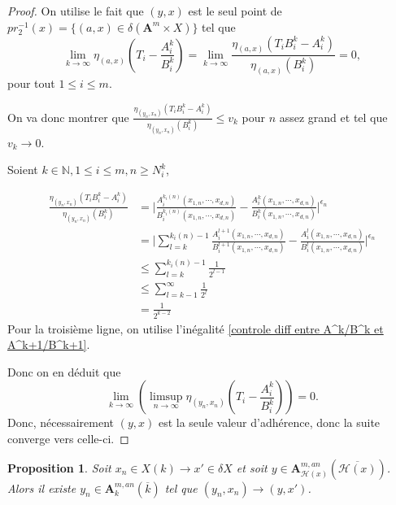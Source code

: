 \documentclass[11pt]{article}
\newcommand{\N}{\mathbb{N}}
\newcommand{\ana}{\mathbf{A}}
\newtheorem{prop}[thm]{Proposition}
\begin{document}
\begin{proof}
On utilise le fait que $(y,x)$ est le seul point de $pr_2^{-1}(x) = \lbrace (a,x) \in \delta (\ana^m \times X)\rbrace$ tel que 
$$\lim\limits_{k \to \infty} \eta_{(a,x)} (T_{i} - \frac{A^k_{i}}{B_{i}^k}) = \lim\limits_{k \to \infty} \frac{\eta_{(a,x)} (T_{i}B_{i}^k - A^k_{i})}{\eta_{(a,x)}(B_{i}^k)} = 0,$$
pour tout $1 \leq i \leq m$. 

On va donc montrer que $\frac{\eta_{(y_n,x_n)} (T_{i}B_{i}^k - A^k_{i})}{\eta_{(y_n,x_n)}(B_{i}^k)} \leq v_k$ pour $n$ assez grand et tel que $v_k \rightarrow 0$. 

Soient $k \in \N, 1 \leq i \leq m, n \geq N^k_{i}$,

\begin{align}\label{Controle A^k(n)/B^k(n) - A^k/B^k}
\frac{\eta_{(y_n,x_n)} (T_{i}B_{i}^k - A^k_{i})}{\eta_{(y_n,x_n)}(B_{i}^k)} &= \Biggr\vert \frac{A_{i}^{k_{i}(n)}(x_{1,n}, \cdots, x_{d,n})}{B_{i}^{k_{i}(n)}(x_{1,n}, \cdots, x_{d,n})} - \frac{ A_{i}^k(x_{1,n}, \cdots, x_{d,n})}{B_{i}^k(x_{1,n}, \cdots, x_{d,n})}\Biggr\rvert^{\epsilon_n}\nonumber\\
&= \Biggr\lvert \sum\limits_{l=k}^{k_{i}(n)-1}\frac{A_{i}^{l+1}(x_{1,n}, \cdots, x_{d,n})}{B_{i}^{l+1}(x_{1,n}, \cdots, x_{d,n})} - \frac{A_{i}^l(x_{1,n}, \cdots, x_{d,n})}{B_{i}^l(x_{1,n}, \cdots, x_{d,n})}\Biggr\rvert^{\epsilon_n}\nonumber\\
&\leq \sum\limits_{l=k}^{k_{i}(n)-1} \frac{1}{2^{l-1}} \nonumber\\
&\leq \sum\limits_{l=k-1}^{\infty} \frac{1}{2^{l}} \nonumber\\ 
&= \frac{1}{2^{k-2}}
\end{align}
Pour la troisième ligne, on utilise l'inégalité \ref{controle diff entre A^k/B^k et A^k+1/B^k+1}.

Donc on en déduit que 
\begin{equation*}
\lim\limits_{k\to \infty} (\limsup\limits_{n\to \infty} \eta_{(y_n, x_n)}(T_{i} -\frac{A^k_{i}}{B_{i}^k} )) = 0.
\end{equation*}
Donc, nécessairement $(y,x)$ est la seule valeur d'adhérence, donc la suite converge vers celle-ci.
\end{proof}
\begin{prop}\label{existence de y_n qui tends vers y pour tout point de type 1}
Soit $x_n \in X(k) \rightarrow x' \in \delta X$ et soit $y \in \ana^{m,an}_{\mathcal{H}(x)}(\overline{\mathcal{H}(x)})$. Alors il existe $y_n \in \ana^{m,an}_k(\overline{k})$ tel que $(y_n, x_n) \rightarrow (y,x')$.
\end{prop}
\end{document}
